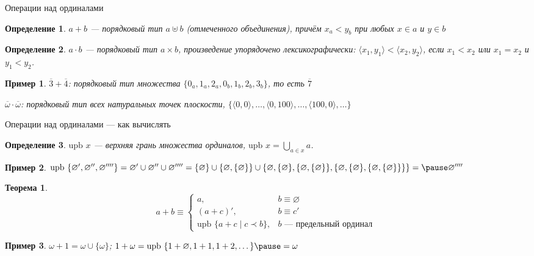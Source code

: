 \documentclass[aspectratio=169]{beamer}
\newtheorem{thm}{Теорема}[section]
\newtheorem{dfn}{Определение}[section]
\newtheorem{exm}{Пример}[section]
\begin{document}
\begin{frame}{Операции над ординалами}
\begin{dfn}$a + b$ --- порядковый тип $a \uplus b$ (отмеченного объединения), причём $x_a < y_b$ при любых
$x \in a$ и $y \in b$\end{dfn}

\begin{dfn}$a \cdot b$ --- порядковый тип $a \times b$, произведение упорядочено лексикографически: $\langle x_1, y_1 \rangle < \langle x_2, y_2 \rangle$, 
если $x_1 < x_2$ или $x_1 = x_2$ и $y_1 < y_2$.\end{dfn}

\begin{exm}$\overline{3} + \overline{4}$: порядковый тип множества $\{0_a, 1_a, 2_a, 0_b, 1_b, 2_b, 3_b\}$, то есть $\overline{7}$

$\overline{\omega} \cdot \overline{\omega}$: порядковый тип всех натуральных точек плоскости, $\{\langle 0,0 \rangle, \dots, \langle 0,100\rangle, \dots, \langle 100,0\rangle, \dots\}$\end{exm}
\end{frame}

\begin{frame}{Операции над ординалами --- как вычислять}
\begin{dfn}$\text{upb } x$ --- верхняя грань множества ординалов, $\text{upb }x = \bigcup_{a \in x} a$.\end{dfn} \pause
\begin{exm}$\text{upb } \{ \varnothing', \varnothing'', \varnothing'''' \} = \varnothing' \cup \varnothing'' \cup \varnothing'''' =
\{ \varnothing \} \cup \{ \varnothing, \{ \varnothing \} \} \cup \{ \varnothing, \{ \varnothing \}, \{ \varnothing, \{ \varnothing \} \}, \{ \varnothing, \{ \varnothing \}, \{ \varnothing, \{ \varnothing \} \} \} \}
= \pause \varnothing''''$\end{exm} \pause

\begin{thm}
$$a + b \equiv \left\{ \begin{array}{rl} 
   a, & b \equiv \varnothing\\
   (a + c)', & b \equiv c'\\
   \text{upb } \{ a+c \mid c \prec b \}, &\mbox{$b$ --- предельный ординал }\end{array}\right.$$\end{thm}

\begin{exm}$\omega + 1 = \omega \cup \{\omega\}$; \pause $1 + \omega = \text{upb }\{ 1+\varnothing, 1+1, 1+2, \dots \} \pause = \omega$\end{exm}
\end{frame}
\end{document}

